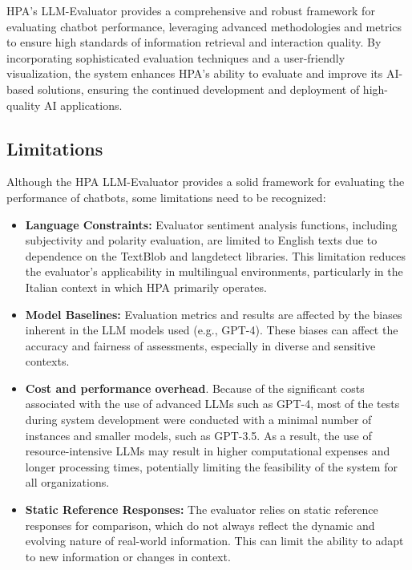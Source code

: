 HPA's LLM-Evaluator provides a comprehensive and robust framework for evaluating chatbot performance, leveraging advanced methodologies and metrics to ensure high standards of information retrieval and interaction quality. By incorporating sophisticated evaluation techniques and a user-friendly visualization, the system enhances HPA's ability to evaluate and improve its AI-based solutions, ensuring the continued development and deployment of high-quality AI applications.

\subsection{Limitations}

Although the HPA LLM-Evaluator provides a solid framework for evaluating the performance of chatbots, some limitations need to be recognized:

\begin{itemize}
    \item \textbf{Language Constraints:} Evaluator sentiment analysis functions, including subjectivity and polarity evaluation, are limited to English texts due to dependence on the TextBlob and langdetect libraries. This limitation reduces the evaluator's applicability in multilingual environments, particularly in the Italian context in which HPA primarily operates.
    \item \textbf{Model Baselines:} Evaluation metrics and results are affected by the biases inherent in the LLM models used (e.g., GPT-4). These biases can affect the accuracy and fairness of assessments, especially in diverse and sensitive contexts.
    \item \textbf{Cost and performance overhead}. Because of the significant costs associated with the use of advanced LLMs such as GPT-4, most of the tests during system development were conducted with a minimal number of instances and smaller models, such as GPT-3.5. As a result, the use of resource-intensive LLMs may result in higher computational expenses and longer processing times, potentially limiting the feasibility of the system for all organizations.
    \item \textbf{Static Reference Responses:} The evaluator relies on static reference responses for comparison, which do not always reflect the dynamic and evolving nature of real-world information. This can limit the ability to adapt to new information or changes in context.
\end{itemize}

